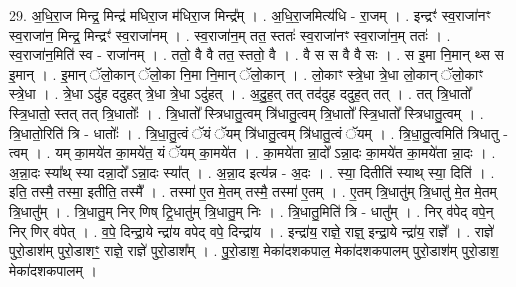 \documentclass[17pt]{extarticle}
\begin{document}
29. अ॒धि॒रा॒ज मिन्द्र॒ मिन्द्र॑ मधिरा॒ज म॑धिरा॒ज मिन्द्र᳚म् । . अ॒धि॒रा॒जमित्य॑धि - रा॒जम् । . इन्द्रꣳ॑ स्व॒राजा॑नꣳ स्व॒राजा॑न॒ मिन्द्र॒ मिन्द्रꣳ॑ स्व॒राजा॑नम् । . स्व॒राजा॑न॒म् तत॒ स्ततः॑ स्व॒राजा॑नꣳ स्व॒राजा॑न॒म् ततः॑ । . स्व॒राजा॑न॒मिति॑ स्व - राजा॑नम् । . ततो॒ वै वै तत॒ स्ततो॒ वै । . वै स स वै वै सः । . स इ॒मा नि॒मान् थ्स स इ॒मान् । . इ॒मान् ॅलो॒कान् ॅलो॒का नि॒मा नि॒मान् ॅलो॒कान् । . लो॒काꣳ स्त्रे॒धा त्रे॒धा लो॒कान् ॅलो॒काꣳ स्त्रे॒धा । . त्रे॒धा ऽदु॑ह ददुहत् त्रे॒धा त्रे॒धा ऽदु॑हत् । . अ॒दु॒ह॒त् तत् तद॑दुह ददुह॒त् तत् । . तत् त्रि॒धातो᳚ स्त्रि॒धातो॒ स्तत् तत् त्रि॒धातोः᳚ । . त्रि॒धातो᳚ स्त्रिधातु॒त्वम् त्रि॑धातु॒त्वम् त्रि॒धातो᳚ स्त्रि॒धातो᳚ स्त्रिधातु॒त्वम् । . त्रि॒धातो॒रिति॑ त्रि - धातोः᳚ । . त्रि॒धा॒तु॒त्वं ॅयं ॅयम् त्रि॑धातु॒त्वम् त्रि॑धातु॒त्वं ॅयम् । . त्रि॒धा॒तु॒त्वमिति॑ त्रिधातु - त्वम् । . यम् का॒मये॑त का॒मये॑त॒ यं ॅयम् का॒मये॑त । . का॒मये॑ता न्ना॒दो᳚ ऽन्ना॒दः का॒मये॑त का॒मये॑ता न्ना॒दः । . अ॒न्ना॒दः स्या᳚थ् स्या दन्ना॒दो᳚ ऽन्ना॒दः स्या᳚त् । . अ॒न्ना॒द इत्य॑न्न - अ॒दः । . स्या॒ दितीति॑ स्याथ् स्या॒ दिति॑ । . इति॒ तस्मै॒ तस्मा॒ इतीति॒ तस्मै᳚ । . तस्मा॑ ए॒त मे॒तम् तस्मै॒ तस्मा॑ ए॒तम् । . ए॒तम् त्रि॒धातु॑म् त्रि॒धातु॑ मे॒त मे॒तम् त्रि॒धातु᳚म् । . त्रि॒धातु॒म् निर् णिष् ट्रि॒धातु॑म् त्रि॒धातु॒म् निः । . त्रि॒धातु॒मिति॑ त्रि - धातु᳚म् । . निर् व॑पेद् वपे॒न् निर् णिर् व॑पेत् । . व॒पे॒ दिन्द्रा॒ये न्द्रा॑य वपेद् वपे॒ दिन्द्रा॑य । . इन्द्रा॑य॒ राज्ञे॒ राज्ञ्॒ इन्द्रा॒ये न्द्रा॑य॒ राज्ञे᳚ । . राज्ञे॑ पुरो॒डाश॑म् पुरो॒डाशꣳ॒॒ राज्ञे॒ राज्ञे॑ पुरो॒डाश᳚म् । . पु॒रो॒डाश॒ मेका॑दशकपाल॒ मेका॑दशकपालम् पुरो॒डाश॑म् पुरो॒डाश॒ मेका॑दशकपालम् । \newline
\end{document}
